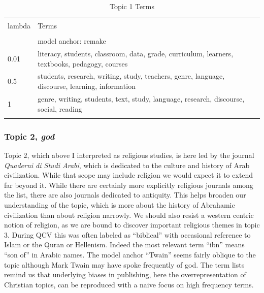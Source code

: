 \documentclass[]{book}
\theoremstyle{definition}
\theoremstyle{definition}
\theoremstyle{definition}
\theoremstyle{remark}
\begin{document}
\begin{table}[!htbp] \centering 
  \caption{Topic 1 Terms} 
  \label{tab:t1d} 
\begin{tabularx}{\textwidth}{@{\extracolsep{5pt}} lY} 
\\[-1.8ex]\hline 
\hline \\[-1.8ex] 
lambda & Terms \\ 
\hline \\[-1.8ex] 
 & model anchor: remake \\ 
0.01 & literacy, students, classroom, data, grade, curriculum, learners, textbooks, pedagogy, courses \\ 
0.5 & students, research, writing, study, teachers, genre, language, discourse, learning, information \\ 
1 & genre, writing, students, text, study, language, research, discourse, social, reading \\ 
\hline \\[-1.8ex] 
\end{tabularx} 
\end{table}

\hypertarget{topic-2-god}{%
\subsubsection{\texorpdfstring{Topic 2,
\emph{god}}{Topic 2, god}}\label{topic-2-god}}

Topic 2, which above I interpreted as religious studies, is here led by
the journal \emph{Quaderni di Studi Arabi}, which is dedicated to the
culture and history of Arab civilization. While that scope may include
religion we would expect it to extend far beyond it. While there are
certainly more explicitly religious journals among the list, there are
also journals dedicated to antiquity. This helps broaden our
understanding of the topic, which is more about the history of Abrahamic
civilization than about religion narrowly. We should also resist a
western centric notion of religion, as we are bound to discover
important religious themes in topic 3. During QCV this was often labeled
as ``biblical'' with occasional reference to Islam or the Quran or
Hellenism. Indeed the most relevant term ``ibn'' means ``son of'' in
Arabic names. The model anchor ``Twain'' seems fairly oblique to the
topic although Mark Twain may have spoke frequently of god. The term
lists remind us that underlying biases in publishing, here the
overrepresentation of Christian topics, can be reproduced with a naive
focus on high frequency terms.
\end{document}

